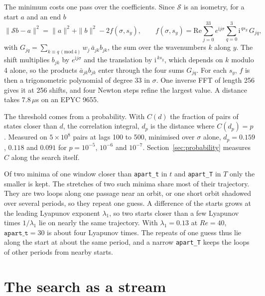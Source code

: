 \documentclass[11pt]{article}
\newcommand{\code}[1]{\texttt{#1}}
\begin{document}
The minimum costs one pass over the coefficients. Since $\mathcal{S}$ is an isometry, for a start $a$ and an end $b$
\begin{equation}
\|\mathcal{S} b - a\|^2 = \|a\|^2 + \|b\|^2 - 2 f(\sigma, s_y), \qquad f(\sigma, s_y) = \mathrm{Re} \sum_{j=0}^{33} e^{\mathrm{i} j \sigma} \sum_{q=0}^{3} \mathrm{i}^{\,q s_y}\, G_{jq},
\label{eq:poly}
\end{equation}
with $G_{jq} = \sum_{k \equiv q\,(\mathrm{mod}\,4)} w_j\, \bar a_{jk} b_{jk}$, the sum over the wavenumbers $k$ along $y$. The shift multiplies $b_{jk}$ by $e^{\mathrm{i} j \sigma}$ and the translation by $\mathrm{i}^{\,k s_y}$, which depends on $k$ modulo 4 alone, so the products $\bar a_{jk} b_{jk}$ enter through the four sums $G_{jq}$. For each $s_y$, $f$ is then a trigonometric polynomial of degree 33 in $\sigma$. One inverse FFT of length 256 gives it at 256 shifts, and four Newton steps refine the largest value. A distance takes $7.8\,\mu$s on an EPYC 9655.

The threshold comes from a probability. With $C(d)$ the fraction of pairs of states closer than $d$, the correlation integral, $d_p$ is the distance where $C(d_p) = p$. Measured on $5 \times 10^8$ pairs at lags 100 to 500, minimised over $\sigma$ alone, $d_p = 0.159$, $0.118$ and $0.091$ for $p = 10^{-5}$, $10^{-6}$ and $10^{-7}$. Section~\ref{sec:probability} measures $C$ along the search itself.

Of two minima of one window closer than \code{apart\_t} in $t$ and \code{apart\_T} in $T$ only the smaller is kept. The stretches of two such minima share most of their trajectory. They are two loops along one passage near an orbit, or one short orbit shadowed over several periods, so they repeat one guess. A difference of the starts grows at the leading Lyapunov exponent $\lambda_1$, so two starts closer than a few Lyapunov times $1/\lambda_1$ lie on nearly the same trajectory. With $\lambda_1 = 0.13$ at $Re = 40$, $\code{apart\_t} = 30$ is about four Lyapunov times. The repeats of one guess thus lie along the start at about the same period, and a narrow \code{apart\_T} keeps the loops of other periods from nearby starts.

\section{The search as a stream}
\label{sec:stream}
\end{document}
